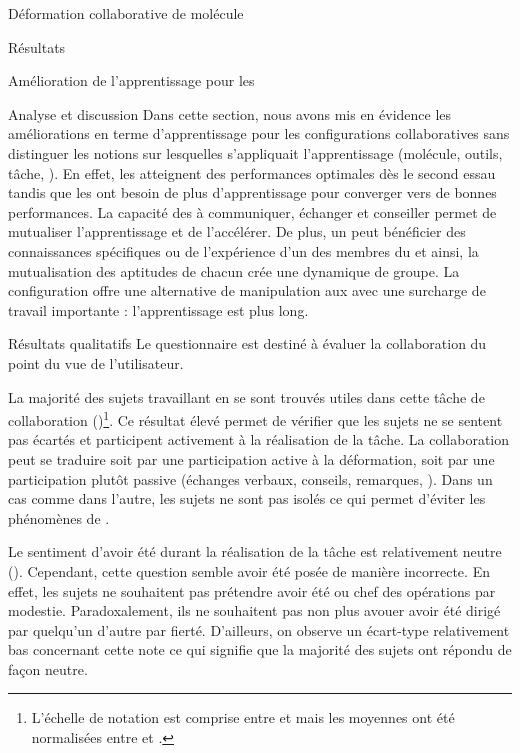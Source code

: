 \documentclass[myfrancais,ngerman,english,french]{mythesis}
\begin{document}
\begin{mychapter}{Déformation collaborative de molécule}
\begin{mysection}{Résultats}
\begin{mysubsection}{Amélioration de l'apprentissage pour les }
\begin{mysubsubsection}{Analyse et discussion}
					Dans cette section, nous avons mis en évidence les améliorations en terme d'apprentissage pour les configurations collaboratives sans distinguer les notions sur lesquelles s'appliquait l'apprentissage (molécule, outils, tâche, \myetc).
					En effet, les  atteignent des performances optimales dès le second essau tandis que les  ont besoin de plus d'apprentissage pour converger vers de bonnes performances.
					La capacité des  à communiquer, échanger et conseiller permet de mutualiser l'apprentissage et de l'accélérer.
					De plus, un  peut bénéficier des connaissances spécifiques ou de l'expérience d'un des membres du  et ainsi, la mutualisation des aptitudes de chacun crée une dynamique de groupe.
					La configuration  offre une alternative de manipulation aux  avec une surcharge de travail importante : l'apprentissage est plus long.
				\end{mysubsubsection}
			\end{mysubsection}
			\begin{mysubsection}{Résultats qualitatifs}
				Le questionnaire est destiné à évaluer la collaboration du point du vue de l'utilisateur.

				La majorité des sujets travaillant en  se sont trouvés utiles dans cette tâche de collaboration ()\footnote{L'échelle de notation est comprise entre  et  mais les moyennes ont été normalisées entre  et .}.
				Ce résultat élevé permet de vérifier que les sujets ne se sentent pas écartés et participent activement à la réalisation de la tâche.
				La collaboration peut se traduire soit par une participation active à la déformation, soit par une participation plutôt passive (échanges verbaux, conseils, remarques, \myetc).
				Dans un cas comme dans l'autre, les sujets ne sont pas isolés ce qui permet d'éviter les phénomènes de .

				Le sentiment d'avoir été  durant la réalisation de la tâche est relativement neutre ().
				Cependant, cette question semble avoir été posée de manière incorrecte.
				En effet, les sujets ne souhaitent pas prétendre avoir été  ou chef des opérations par modestie.
				Paradoxalement, ils ne souhaitent pas non plus avouer avoir été dirigé par quelqu'un d'autre par fierté.
				D'ailleurs, on observe un écart-type relativement bas concernant cette note ce qui signifie que la majorité des sujets ont répondu de façon neutre.


\end{mysubsection}
\end{mysection}
\end{mychapter}
\end{document}
